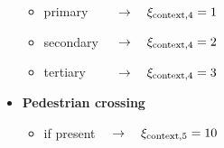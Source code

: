 \begin{itemize}
\begin{itemize}
                        \item primary $\qquad\to\quad\xi_{\rm{context,4}}=1$
                        \item secondary $\,\quad\to\quad\xi_{\rm{context,4}}=2$
                        \item tertiary $\,\qquad\to\quad\xi_{\rm{context,4}}=3$
                    \end{itemize}
                \item \textbf{Pedestrian crossing}
                    \begin{itemize}
                        \item if present $\quad\to\quad\xi_{\rm{context,5}}=10$
                    \end{itemize}
            \end{itemize}

